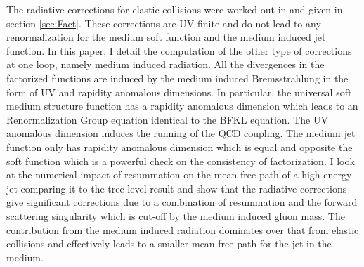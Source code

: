 \documentclass[letter,11pt]{article}
\begin{document}
The radiative corrections for elastic collisions were worked out in \cite{Vaidya:2020lih} and given in section \ref{sec:Fact}. These corrections are UV finite and do not lead to any renormalization for the medium soft function and the medium induced jet function. 
In this paper, I detail the computation of the other type of corrections at one loop, namely medium induced radiation. All the divergences in the factorized functions are induced by the medium induced Bremsstrahlung in the form of UV and rapidity anomalous dimensions. In particular, the universal soft medium structure function has a rapidity anomalous dimension which leads to an Renormalization Group equation identical to the BFKL equation. The UV anomalous dimension induces the running of the QCD coupling. The medium jet function only has rapidity anomalous dimension which is equal and opposite the soft function which is a powerful check on the consistency of factorization. 
I look at the numerical impact of resummation on the mean free path of a high energy jet comparing it to the tree level result and show that the radiative corrections give significant corrections due to a combination of resummation and the forward scattering singularity which is cut-off by the medium induced gluon mass. The contribution from the medium induced radiation dominates over that from elastic collisions and effectively leads to a smaller mean free path for the jet in the medium. 
\end{document}

